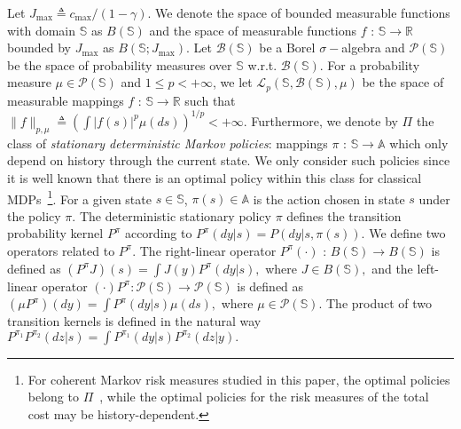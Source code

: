 \documentclass[12pt,technote,onecolumn]{IEEEtran}
\begin{document}
Let $J_{\max}\triangleq c_{\max}/\left(1-\gamma\right)$. We denote the space of bounded measurable functions with domain $\mathbb{S}$ as $B(\mathbb{S})$ and the space of measurable functions $f\mbox{ : }\mathbb{S}\rightarrow\mathbb{R}$
bounded by $J_{\max}$ as $B\left(\mathbb{S};J_{\max}\right)$. Let $\mathcal{B}(\mathbb{S})$ be a Borel $\sigma-$algebra and $\mathcal{P}\left(\mathbb{S}\right)$
be the space of probability measures over $\mathbb{S}$ w.r.t. $\mathcal{B}\left(\mathbb{S}\right)$. For a probability measure $\mu\mathcal{\in P\left(\mathbb{S}\right)}$
and $1\leq p<+\infty$, we let $\mathcal{L}_{p}(\mathbb{S},\mathcal{B}\left(\mathbb{S}\right),\mu)$
be the space of measurable mappings $f\mbox{ : }\mathbb{S}\rightarrow\mathbb{R}$
such that $\|f\|_{p,\mu}\triangleq(\int|f\left(s\right)|^{p}\mu\left(ds\right))^{1/p}<+\infty$. Furthermore, we denote by $\Pi$ the class of \textit{stationary deterministic Markov policies}:
mappings $\pi\mbox{ : }\mathbb{S}\rightarrow\mathbb{A}$ which only
depend on history through the current state. We only consider such
policies since it is well known that there is an optimal policy within
this class for classical MDPs~\cite{puterman2014markov}\footnote{For coherent Markov risk measures studied in this paper, the optimal policies belong to $\Pi$~\cite{ruszczynski2010risk}, while the optimal policies for the risk measures of the total cost may be history-dependent.}. For a given state $s\in\mathbb{S}$,
$\pi\left(s\right)\in\mathbb{A}$ is the action chosen in state $s$
under the policy $\pi$. The deterministic stationary policy $\pi$
defines the transition probability kernel $P^{\pi}$ according to
$P^{\pi}\left(dy\vert s\right)=P\left(dy\vert s,\pi\left(s\right)\right)$.
We define two operators related to $P^{\pi}$. The right-linear operator
$P^{\pi}\left(\cdot\right)\mbox{ : }B(\mathbb{S})\rightarrow B(\mathbb{S})$
is defined as
$
\left(P^{\pi}J\right)\left(s\right)=\int J\left(y\right)P^{\pi}\left(dy|s\right),
$
where $J\in B\left(\mathbb{S}\right),$ and the left-linear
operator $\left(\cdot\right)P^{\pi}:\mathcal{P}\left(\mathbb{S}\right)\rightarrow\mathcal{P}\left(\mathbb{S}\right)$
is defined as
$
\left(\mu P^{\pi}\right)\left(dy\right)=\int P^{\pi}\left(dy|s\right)\mu\left(ds\right),
$
where $\mu\in\mathcal{P}\left(\mathbb{S}\right)$. The product of
two transition kernels is defined in the natural way
$
P^{\pi_{1}}P^{\pi_{2}}\left(dz\vert s\right)=\int P^{\pi_{1}}\left(dy\vert s\right)P^{\pi_{2}}\left(dz\vert y\right).
$
\end{document}
